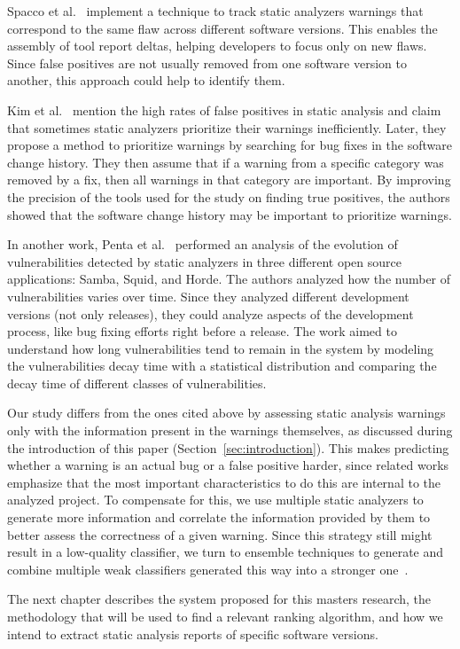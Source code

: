 Spacco et al.~\cite{spacco_tracking_2006} implement a technique
to track static analyzers warnings that correspond to the same flaw across
different software versions. This enables the assembly of tool report
deltas, helping developers to focus only on new flaws. Since false positives
are not usually removed from one software version to another, this approach
could help to identify them.

Kim et al.~\cite{kim_which_2007} mention the high rates of false positives in
static analysis and claim that sometimes static analyzers prioritize their
warnings inefficiently. Later, they propose a method to prioritize
warnings by searching for bug fixes in the software change history. They then
assume that if a warning from a specific category was removed by a fix, then
all warnings in that category are important. By improving the precision of the
tools used for the study on finding true positives, the authors showed that the
software change history may be important to prioritize warnings.

In another work, Penta et al.~\cite{penta_evolution_2008} performed an analysis
of the evolution of vulnerabilities detected by static analyzers in three
different open source applications: Samba, Squid, and Horde. The authors
analyzed how the number of vulnerabilities varies over time. Since they
analyzed different development versions (not only releases), they could analyze
aspects of the development process, like bug fixing efforts right before a
release. The work aimed to understand how long vulnerabilities tend
to remain in the system by modeling the vulnerabilities decay time with a
statistical distribution and comparing the decay time of different classes of
vulnerabilities.

Our study differs from the ones cited above by assessing static analysis
warnings only with the information present in the warnings themselves, as
discussed during the introduction of this paper
(Section~\ref{sec:introduction}).  This makes predicting whether a warning is
an actual bug or a false positive harder, since related works emphasize that
the most important characteristics to do this are internal to the analyzed
project. To compensate for this, we use multiple static analyzers to generate
more information and correlate the information provided by them to better
assess the correctness of a given warning.  Since this strategy still might
result in a low-quality classifier, we turn to ensemble techniques to generate
and combine multiple weak classifiers generated this way into a stronger
one~\cite{aima}.

The next chapter describes the system proposed for this masters research, the
methodology that will be used to find a relevant ranking algorithm, and how we
intend to extract static analysis reports of specific software versions.
